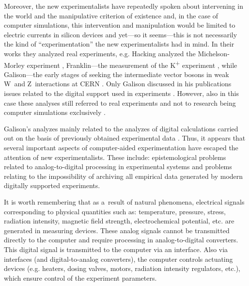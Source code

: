 Moreover, the new experimentalists have repeatedly spoken about intervening in the world 
\parencite[][pp.149–219]{hacking_representing_1983} %
 and the manipulative criterion of existence 
\parencite[][pp.220–232]{hacking_representing_1983} %
 and, in the case of computer simulations, this intervention and manipulation would be limited to electric currents in silicon devices and yet---so it seems---this is not necessarily the kind of ``experimentation'' the new experimentalists had in mind. In their works they analyzed real experiments, e.g. Hacking analyzed the Michelson-Morley experiment 
\parencite[][pp.253–261]{hacking_representing_1983}, %
 Franklin---the measurement of the K\textsuperscript{+} experiment 
\parencite[][pp.115–131]{franklin_experiment_1990}, %
 while Galison---the early stages of seeking the intermediate vector bosons in weak W~and Z~interactions at CERN 
\parencite[][pp.198–208]{galison_how_1987}. %
 Only Galison discussed in his publications issues related to the digital support used in experiments 
\parencite[][pp.752–780]{galison_image_1997}. %
 However, also in this case these analyses still referred to real experiments and not to research being computer simulations exclusively 
\parencite[][pp.689–752]{galison_image_1997}.%




Galison's analyzes mainly related to the analyzes of digital calculations carried out on the basis of previously obtained experimental data 
\parencite[][pp.1–7]{}. %
 Thus, it appears that several important aspects of computer-aided experimentation have escaped the attention of new experimentalists. These include: epistemological problems related to analog-to-digital processing in experimental systems and problems relating to the impossibility of archiving all empirical data generated by modern digitally supported experiments.



It is worth remembering that as a~result of natural phenomena, electrical signals corresponding to physical quantities such as: temperature, pressure, stress, radiation intensity, magnetic field strength, electrochemical potential, etc. are generated in measuring devices. These analog signals cannot be transmitted directly to the computer and require processing in analog-to-digital converters. This digital signal is transmitted to the computer via an interface. Also via interfaces (and digital-to-analog converters), the computer controls actuating devices (e.g. heaters, dosing valves, motors, radiation intensity regulators, etc.), which ensure control of the experiment parameters.



